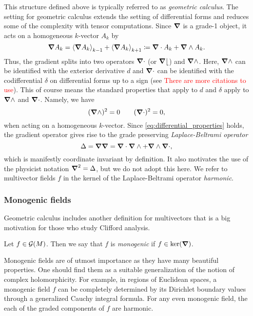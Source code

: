 This structure defined above is typically referred to as \emph{geometric calculus}.  The setting for geometric calculus extends the setting of differential forms and reduces some of the complexity with tensor computations.  Since $\grad$ is a grade-1 object, it acts on a homogeneous $k$-vector $A_k$ by
\[
\grad A_k = \proj{k-1}{\grad A_k} + \proj{k+1}{\grad A_k} \coloneqq \grad \cdot A_k + \grad \wedge A_k.
\]
Thus, the gradient splits into two operators $\grad \cdot$ (or $\grad \lfloor$) and $\grad \wedge$.  Here, $\grad \wedge$ can be identified with the exterior derivative $d$ and $\grad \cdot$ can be identified with the codifferential $\delta$ on differential forms up to a sign (see \cite{schindler_geometric_2020} \textcolor{red}{There are more citations to use}). This of course means the standard properties that apply to $d$ and $\delta$ apply to $\grad \wedge$ and $\grad \cdot$. Namely, we have
\begin{equation}
\label{eq:differential_properties}
(\grad \wedge)^2=0 \qquad (\grad \cdot)^2 = 0,
\end{equation}
when acting on a homogeneous $k$-vector. Since \ref{eq:differential_properties} holds, the gradient operator gives rise to the grade preserving \emph{Laplace-Beltrami operator}
\[
\Delta = \grad \grad = \grad \cdot \grad \wedge + \grad \wedge \grad \cdot,
\]
which is manifestly coordinate invariant by definition.  It also motivates the use of the physicist notation $\grad^2=\Delta$, but we do not adopt this here.  We refer to multivector fields $f$ in the kernel of the Laplace-Beltrami operator \emph{harmonic}.

\subsubsection{Monogenic fields}

Geometric calculus includes another definition for multivectors that is a big motivation for those who study Clifford analysis. 
\begin{definition}
 Let $f \in \multivectorfields$. Then we say that $f$ is \emph{monogenic} if $f \in \ker(\grad)$.
\end{definition}

Monogenic fields are of utmost importance as they have many beautiful properties. One should find them as a suitable generalization of the notion of complex holomorphicity. For example, in regions of Euclidean spaces, a monogenic field $f$ can be completely determined by its Dirichlet boundary values through a generalized Cauchy integral formula. For any even monogenic field, the each of the graded components of $f$ are harmonic.  

